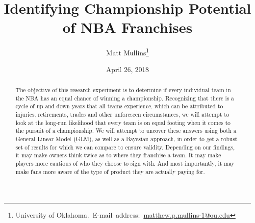 \documentclass[12pt,english]{article}
\begin{document}
\begin{singlespace}
\title{Identifying Championship Potential of NBA Franchises}

\end{singlespace}

\author{Matt Mullins\thanks{ University of Oklahoma.\
E-mail~address:~\href{mailto:student.matthew.p.mullins-1@ou.edu}{matthew.p.mullins-1@ou.edu}}}

\date{April 26, 2018}

\maketitle

\begin{abstract}
\begin{singlespace}
The objective of this research experiment is to determine if every individual team in the NBA has an equal chance of winning a championship. Recognizing that there is a cycle of up and down years that all teams experience, which can be attributed to injuries, retirements, trades and other unforeseen circumstances, we will attempt to look at the long-run likelihood that every team is on equal footing when it comes to the pursuit of a championship. We will attempt to uncover these answers using both a General Linear Model (GLM), as well as a Bayesian approach, in order to get a robust set of results for which we can compare to ensure validity. Depending on our findings, it may make owners think twice as to where they franchise a team. It may make players more cautious of who they choose to sign with. And most importantly, it may make fans more aware of the type of product they are actually paying for. 
\end{singlespace}

\end{abstract}
\vfill{}

\pagebreak{}
\end{document}
